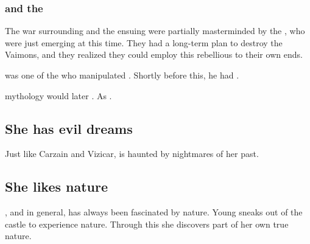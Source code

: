 \subsubsection{\Secherdamon and the \taorthae}
The war surrounding \Belzir and the ensuing \HundredScourges were partially masterminded by the \taorthae, who were just emerging at this time. 
They had a long-term plan to destroy the Vaimons, and they realized they could employ this rebellious \Calipha to their own ends. 

\Secherdamon was one of the \taorthae who manipulated \Belzir.
Shortly before this, he had .

\Ortaican mythology would later . 
As . 









\subsection{She has evil dreams}
Just like Carzain and Vizicar, \Belzir{} is haunted by nightmares of her past. 










\subsection{She likes nature}
\Belzir{}, and \Shiaraid{} in general, has always been fascinated by nature. 
Young \Belzir{} sneaks out of the castle to experience nature. 
Through this she discovers part of her own true nature. 

